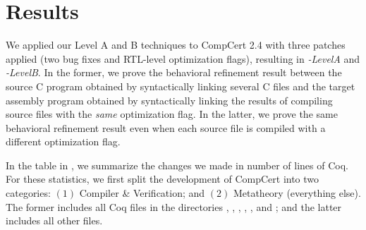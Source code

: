 \section{Results}

\newcommand{\specialcell}[2][c]{%
  \begin{tabular}[#1]{@{}c@{}}#2\end{tabular}}

We applied our Level A and B techniques to CompCert 2.4 with three
patches applied (two bug fixes and RTL-level optimization flags),
resulting in \emph{\sepcomp-LevelA} and \emph{\sepcomp-LevelB}.
In the former, we prove the behavioral refinement result between the
source C program obtained by syntactically linking several C files and
the target assembly program obtained by syntactically linking the
results of compiling source files with the \emph{same} optimization
flag.  In the latter, we prove the same behavioral refinement result
even when each source file is compiled with a different optimization
flag.

\begin{landscape}
\end{landscape}

In the table in , we summarize the changes we
made in number of lines of Coq.  For these statistics, we first split
the development of CompCert into two categories: $(1)$ Compiler \&
Verification; and $(2)$ Metatheory (\ie everything else). The former
includes all Coq files in the directories ,
, , , , and
; and the latter includes all other files.

